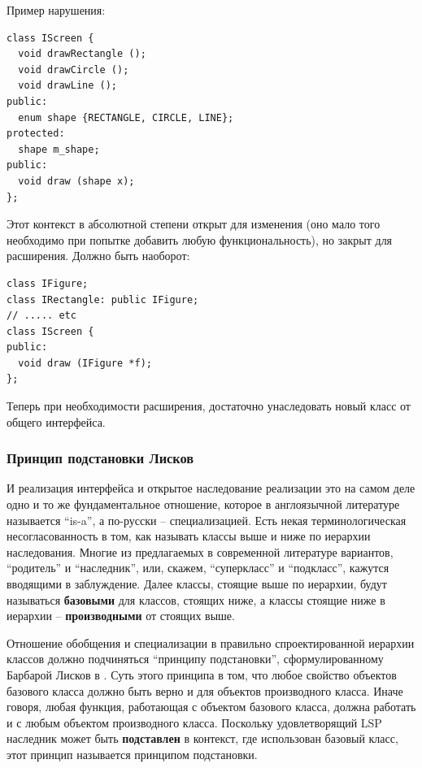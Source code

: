 \documentclass[a4paper,12pt,oneside]{article}
\begin{document}
Пример нарушения:

\begin{lstlisting}
class IScreen {
  void drawRectangle ();
  void drawCircle ();
  void drawLine ();
public:
  enum shape {RECTANGLE, CIRCLE, LINE};
protected:
  shape m_shape;
public:
  void draw (shape x);  
};
\end{lstlisting}

Этот контекст в абсолютной степени открыт для изменения (оно мало того необходимо при попытке добавить любую функциональность), но закрыт для расширения. Должно быть наоборот:

\begin{lstlisting}
class IFigure;
class IRectangle: public IFigure;
// ..... etc
class IScreen {
public:
  void draw (IFigure *f);
};
\end{lstlisting}

Теперь при необходимости расширения, достаточно унаследовать новый класс от общего интерфейса.

\subsubsection{Принцип подстановки Лисков}\label{LSP}

И реализация интерфейса и открытое наследование реализации это на самом деле одно и то же фундаментальное отношение, которое в англоязычной литературе называется ``is-a'', а по-русски -- специализацией. Есть некая терминологическая несогласованность в том, как называть классы выше и ниже по иерархии наследования. Многие из предлагаемых в современной литературе вариантов, ``родитель'' и ``наследник'', или, скажем, ``суперкласс'' и ``подкласс'', кажутся вводящими в заблуждение. Далее классы, стоящие выше по иерархии, будут называться \textbf{базовыми} для классов, стоящих ниже, а классы стоящие ниже в иерархии -- \textbf{производными} от стоящих выше.

Отношение обобщения и специализации в правильно спроектированной иерархии классов должно подчиняться ``принципу подстановки'', сформулированному Барбарой Лисков в \cite{LSP}. Суть этого принципа в том, что любое свойство объектов базового класса должно быть верно и для объектов производного класса. Иначе говоря, любая функция, работающая с объектом базового класса, должна работать и с любым объектом производного класса. Поскольку удовлетворящий LSP наследник может быть \textbf{подставлен} в контекст, где использован базовый класс, этот принцип называется принципом подстановки.
\end{document}

